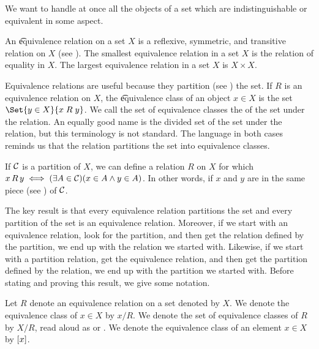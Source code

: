 

We want to handle at once all the objects of a set which are indistinguishable or equivalent in some aspect.


An \t{equivalence relation} on a set $X$ is a reflexive, symmetric, and transitive relation on $X$ (see ).
The smallest equivalence relation in a set $X$ is the relation of equality in $X$.
The largest equivalence relation in a set $X$ is $X \times X$.

Equivalence relations are useful because they partition (see ) the set.
If $R$ is an equivalence relation on $X$, the \t{equivalence class} of an object $x \in X$ is the set $\Set{y \in X}{x\;R\;y}$.
We call the set of equivalence classes the  of the set under the relation.
An equally good name is the divided set of the set under the relation, but this terminology is not standard.
The language in both cases reminds us that the relation partitions the set into equivalence classes.

If $\mathcal{C}$ is a partition of $X$, we can define a relation $R$ on $X$ for which $x\,R\,y \iff (\exists A \in \mathcal{C})(x \in A \land y \in A)$.
In other words, if $x$ and $y$ are in the same piece (see ) of $\mathcal{C}$.

The key result is that every equivalence relation partitions the set and every partition of the set is an equivalence relation.
Moreover, if we start with an equivalence relation, look for the partition, and then get the relation defined by the partition, we end up with the relation we started with.
Likewise, if we start with a partition relation, get the equivalence relation, and then get the partition defined by the relation, we end up with the partition we started with.
Before stating and proving this result, we give some notation.


Let $R$ denote an equivalence relation on a set denoted by $X$.
We denote the equivalence class of $x \in X$ by $x / R$.
We denote the set of equivalence classes of $R$ by $X/R$, read aloud as  or .
We denote the equivalence class of an element $x \in X$ by $[x]$.

